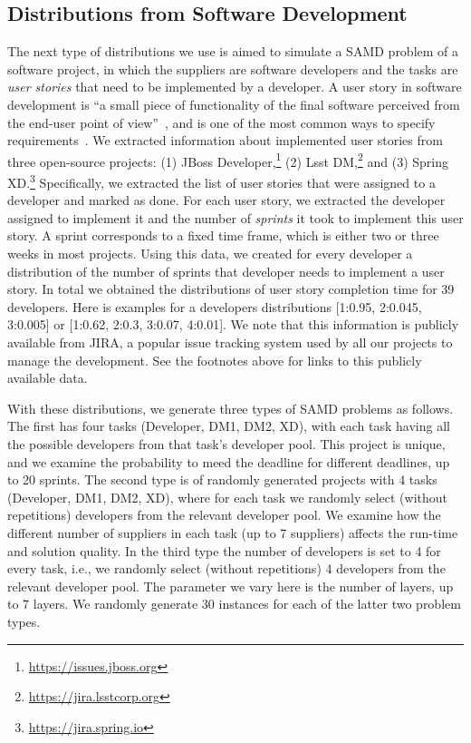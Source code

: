 \documentclass[letterpaper]{article} %
\newcommand{\samd}{\ac{SAMD}\xspace}
\newcommand\Roni[1]{\nb{\textbf{Roni:}}{blue}{#1}}
\begin{document}
\subsection{Distributions from Software Development}
The next type of distributions we use is aimed to simulate a \samd problem of a software project, in which the suppliers are software developers and the tasks are \emph{user stories} that need to be implemented by a developer. A user story in software development is ``a small piece of functionality of the final software perceived from the end-user point of view''~\cite{rees2002feasible}, 
and is one of the most common ways to specify requirements~\cite{kassab2015changing}. We extracted information about implemented user stories from three open-source projects: (1) JBoss Developer,\footnote{\url{https://issues.jboss.org}} (2) Lsst DM,\footnote{\url{https://jira.lsstcorp.org}} and (3) Spring XD.\footnote{\url{https://jira.spring.io}} 
Specifically, we extracted the list of user stories that were assigned to a developer and marked as done. For each user story, we extracted the developer assigned to implement it and the number of \emph{sprints} it took to implement this user story. A sprint corresponds to a fixed time frame, which is either two or three weeks in most projects. Using this data, we created for every developer a distribution of the number of sprints that developer needs to implement a user story. In total we obtained the distributions of user story completion time for 39 developers. Here is examples for a developers distributions [1:0.95,	2:0.045, 3:0.005] or [1:0.62,	2:0.3,	3:0.07,	4:0.01].
We note that this information is publicly available from JIRA, a popular issue tracking system used by all our projects to manage the development. See the footnotes above for links to this publicly available data. 


With these distributions, we generate three types of SAMD problems as follows. The first has four tasks (Developer, DM1, DM2, XD), with each task having all the possible developers from that task's developer pool. This project is unique, and we examine the probability to meed the deadline for different deadlines, up to 20 sprints. The second type is of randomly generated projects with 4 tasks (Developer, DM1, DM2, XD), where for each task we randomly select (without repetitions) developers from the relevant developer pool. We examine how the different number of suppliers in each task (up to 7 suppliers) affects the run-time and solution quality. 
In the third type the number of developers is set to 4 for every task, i.e., we randomly select (without repetitions) 4 developers from the relevant developer pool. The parameter we vary here is the number of layers, up to 7 layers. We randomly generate 30 instances for each of the latter two problem types.
\end{document}
